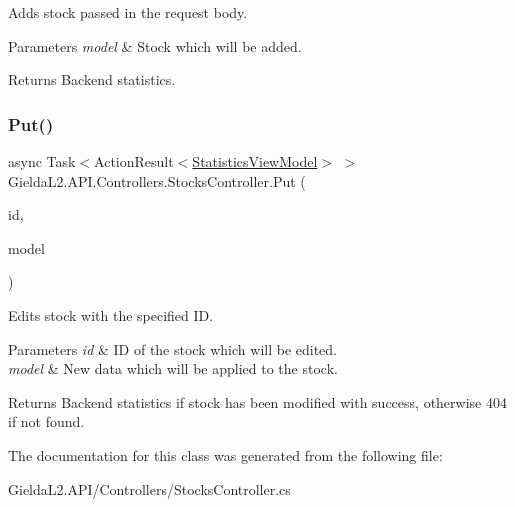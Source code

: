 Adds stock passed in the request body. 


\begin{DoxyParams}{Parameters}
{\em model} & Stock which will be added.\\
\hline
\end{DoxyParams}
\begin{DoxyReturn}{Returns}
Backend statistics.
\end{DoxyReturn}
\mbox{\label{class_gielda_l2_1_1_a_p_i_1_1_controllers_1_1_stocks_controller_a1bd303fea5e96889618d79668344f6ad}} 
\subsubsection{\texorpdfstring{Put()}{Put()}}
{\footnotesize\ttfamily async Task$<$Action\+Result$<$\mbox{\hyperlink{class_gielda_l2_1_1_a_p_i_1_1_view_models_1_1_view_1_1_statistics_view_model}{Statistics\+View\+Model}}$>$ $>$ Gielda\+L2.\+A\+P\+I.\+Controllers.\+Stocks\+Controller.\+Put (\begin{DoxyParamCaption}\item[{int}]{id,  }\item[{\mbox{[}\+From\+Body\mbox{]} \mbox{\hyperlink{class_gielda_l2_1_1_a_p_i_1_1_view_models_1_1_edit_1_1_edit_stock_view_model}{Edit\+Stock\+View\+Model}}}]{model }\end{DoxyParamCaption})}



Edits stock with the specified ID. 


\begin{DoxyParams}{Parameters}
{\em id} & ID of the stock which will be edited.\\
\hline
{\em model} & New data which will be applied to the stock.\\
\hline
\end{DoxyParams}
\begin{DoxyReturn}{Returns}
Backend statistics if stock has been modified with success, otherwise 404 if not found.
\end{DoxyReturn}


The documentation for this class was generated from the following file\+:\begin{DoxyCompactItemize}
\item 
Gielda\+L2.\+A\+P\+I/\+Controllers/Stocks\+Controller.\+cs\end{DoxyCompactItemize}
